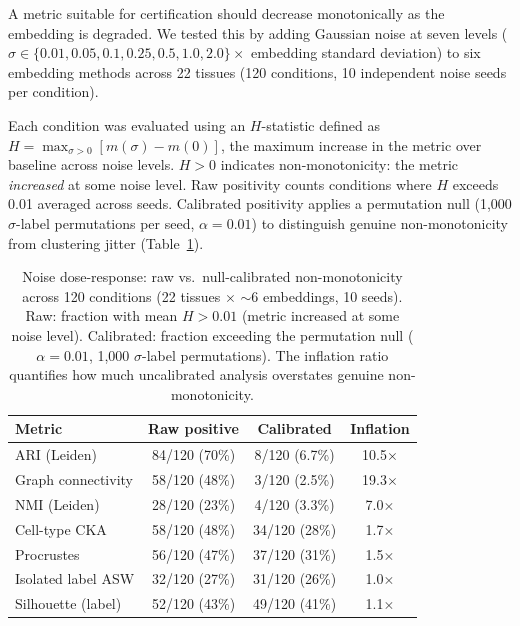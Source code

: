 \documentclass[11pt]{article}
\begin{document}
A metric suitable for certification should decrease monotonically as the
embedding is degraded. We tested this by adding Gaussian noise at seven
levels ($\sigma \in \{0.01, 0.05, 0.1, 0.25, 0.5, 1.0, 2.0\} \times$
embedding standard deviation) to six embedding methods across 22
tissues (120 conditions, 10 independent noise seeds per condition).

Each condition was evaluated using an $H$-statistic defined as
$H = \max_{\sigma > 0}[m(\sigma) - m(0)]$, the maximum increase in
the metric over baseline across noise levels. $H > 0$ indicates non-monotonicity:
the metric \emph{increased} at some noise level. Raw positivity
counts conditions where $H$ exceeds 0.01 averaged across seeds.
Calibrated positivity applies a permutation null (1{,}000
$\sigma$-label permutations per seed, $\alpha = 0.01$) to
distinguish genuine non-monotonicity from clustering jitter
(Table~\ref{tab:noise}).

\begin{table}[t]
\centering
\caption{Noise dose-response: raw vs.\ null-calibrated
non-monotonicity across 120 conditions (22 tissues $\times$ $\sim$6
embeddings, 10 seeds). Raw: fraction with mean $H > 0.01$ (metric
increased at some noise level). Calibrated: fraction exceeding the
permutation null ($\alpha = 0.01$, 1{,}000 $\sigma$-label
permutations). The inflation ratio quantifies how much uncalibrated
analysis overstates genuine non-monotonicity.}
\label{tab:noise}
\small
\begin{tabular}{@{}lccc@{}}
\toprule
Metric & Raw positive & Calibrated & Inflation \\
\midrule
ARI (Leiden)         & 84/120 (70\%) &  8/120 (6.7\%)  & 10.5$\times$ \\
Graph connectivity   & 58/120 (48\%) &  3/120 (2.5\%)  & 19.3$\times$ \\
NMI (Leiden)         & 28/120 (23\%) &  4/120 (3.3\%)  &  7.0$\times$ \\
\midrule
Cell-type CKA        & 58/120 (48\%) & 34/120 (28\%)   &  1.7$\times$ \\
Procrustes           & 56/120 (47\%) & 37/120 (31\%)   &  1.5$\times$ \\
\midrule
Isolated label ASW   & 32/120 (27\%) & 31/120 (26\%)   &  1.0$\times$ \\
Silhouette (label)   & 52/120 (43\%) & 49/120 (41\%)   &  1.1$\times$ \\
\bottomrule
\end{tabular}
\end{table}
\end{document}
